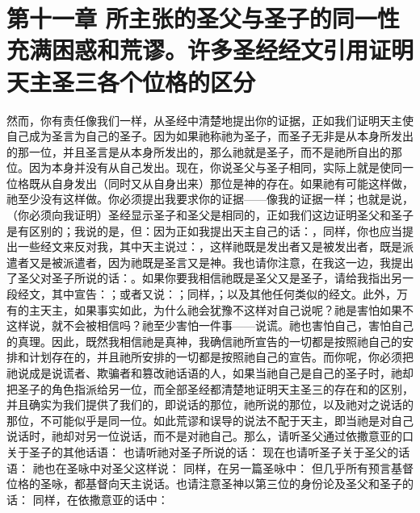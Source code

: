 
\section{第十一章  所主张的圣父与圣子的同一性充满困惑和荒谬。许多圣经经文引用证明天主圣三各个位格的区分}

然而，你有责任像我们一样，从圣经中清楚地提出你的证据，正如我们证明天主使自己成为圣言为自己的圣子。因为如果祂称祂为圣子，而圣子无非是从本身所发出的那一位，并且圣言是从本身所发出的，那么祂就是圣子，而不是祂所自出的那位。因为本身并没有从自己发出。现在，你说圣父与圣子相同，实际上就是使同一位格既从自身发出（同时又从自身出来）那位是神的存在。如果祂有可能这样做，祂至少没有这样做。你必须提出我要求你的证据——像我的证据一样；也就是说，（你必须向我证明）圣经显示圣子和圣父是相同的，正如我们这边证明圣父和圣子是有区别的；我说的是，但：因为正如我提出天主自己的话：，同样，你也应当提出一些经文来反对我，其中天主说过：，这样祂既是发出者又是被发出者，既是派遣者又是被派遣者，因为祂既是圣言又是神。我也请你注意，在我这一边，我提出了圣父对圣子所说的话：。如果你要我相信祂既是圣父又是圣子，请给我指出另一段经文，其中宣告：；或者又说：；同样，；以及其他任何类似的经文。此外，万有的主天主，如果事实如此，为什么祂会犹豫不这样对自己说呢？祂是害怕如果不这样说，就不会被相信吗？祂至少害怕一件事——说谎。祂也害怕自己，害怕自己的真理。因此，既然我相信祂是真神，我确信祂所宣告的一切都是按照祂自己的安排和计划存在的，并且祂所安排的一切都是按照祂自己的宣告。而你呢，你必须把祂说成是说谎者、欺骗者和篡改祂话语的人，如果当祂自己是自己的圣子时，祂却把圣子的角色指派给另一位，而全部圣经都清楚地证明天主圣三的存在和的区别，并且确实为我们提供了我们的，即说话的那位，祂所说的那位，以及祂对之说话的那位，不可能似乎是同一位。如此荒谬和误导的说法不配于天主，即当祂是对自己说话时，祂却对另一位说话，而不是对祂自己。那么，请听圣父通过依撒意亚的口关于圣子的其他话语：  也请听祂对圣子所说的话：  现在也请听圣子关于圣父的话语： 祂也在圣咏中对圣父这样说： 同样，在另一篇圣咏中： 但几乎所有预言基督位格的圣咏，都基督向天主说话。也请注意圣神以第三位的身份论及圣父和圣子的话： 同样，在依撒意亚的话中：  